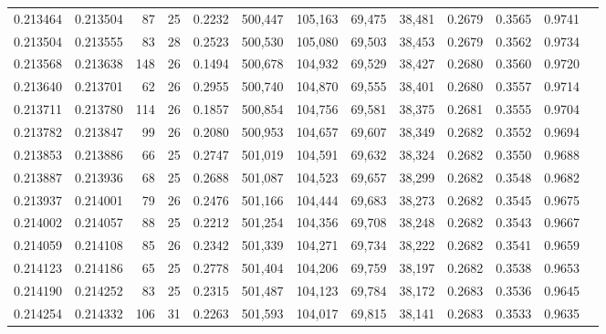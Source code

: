 \begin{tabular}{rrrrrrrrrrrrr}
0.213464 & 0.213504 &  87 &  25 &                                     0.2232 & 500,447 & 105,163 &  69,475 &  38,481 & 0.2679 & 0.3565 & 0.9741 \\
0.213504 & 0.213555 &  83 &  28 &                                     0.2523 & 500,530 & 105,080 &  69,503 &  38,453 & 0.2679 & 0.3562 & 0.9734 \\
0.213568 & 0.213638 & 148 &  26 &                                     0.1494 & 500,678 & 104,932 &  69,529 &  38,427 & 0.2680 & 0.3560 & 0.9720 \\
0.213640 & 0.213701 &  62 &  26 &                                     0.2955 & 500,740 & 104,870 &  69,555 &  38,401 & 0.2680 & 0.3557 & 0.9714 \\
0.213711 & 0.213780 & 114 &  26 &                                     0.1857 & 500,854 & 104,756 &  69,581 &  38,375 & 0.2681 & 0.3555 & 0.9704 \\
0.213782 & 0.213847 &  99 &  26 &                                     0.2080 & 500,953 & 104,657 &  69,607 &  38,349 & 0.2682 & 0.3552 & 0.9694 \\
0.213853 & 0.213886 &  66 &  25 &                                     0.2747 & 501,019 & 104,591 &  69,632 &  38,324 & 0.2682 & 0.3550 & 0.9688 \\
0.213887 & 0.213936 &  68 &  25 &                                     0.2688 & 501,087 & 104,523 &  69,657 &  38,299 & 0.2682 & 0.3548 & 0.9682 \\
0.213937 & 0.214001 &  79 &  26 &                                     0.2476 & 501,166 & 104,444 &  69,683 &  38,273 & 0.2682 & 0.3545 & 0.9675 \\
0.214002 & 0.214057 &  88 &  25 &                                     0.2212 & 501,254 & 104,356 &  69,708 &  38,248 & 0.2682 & 0.3543 & 0.9667 \\
0.214059 & 0.214108 &  85 &  26 &                                     0.2342 & 501,339 & 104,271 &  69,734 &  38,222 & 0.2682 & 0.3541 & 0.9659 \\
0.214123 & 0.214186 &  65 &  25 &                                     0.2778 & 501,404 & 104,206 &  69,759 &  38,197 & 0.2682 & 0.3538 & 0.9653 \\
0.214190 & 0.214252 &  83 &  25 &                                     0.2315 & 501,487 & 104,123 &  69,784 &  38,172 & 0.2683 & 0.3536 & 0.9645 \\
0.214254 & 0.214332 & 106 &  31 &                                     0.2263 & 501,593 & 104,017 &  69,815 &  38,141 & 0.2683 & 0.3533 & 0.9635 \\

\end{tabular}
